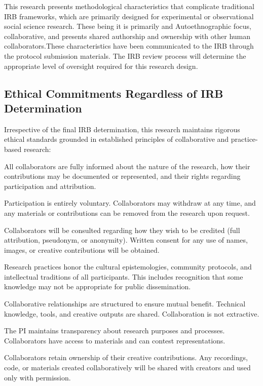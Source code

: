 This research presents methodological characteristics that complicate traditional IRB frameworks, which are primarily designed for experimental or observational social science research. These being it is primarily and Autoethnographic focus, collaborative, and presents shared authorship and ownership with other human collaborators.These characteristics have been communicated to the IRB through the protocol submission materials. The IRB review process will determine the appropriate level of oversight required for this research design.

\subsection*{Ethical Commitments Regardless of IRB Determination}

Irrespective of the final IRB determination, this research maintains rigorous ethical standards grounded in established principles of collaborative and practice-based research:

\begin{description}[noitemsep] 
	\item[Informed Collaboration] All collaborators are fully informed about the nature of the research, how their contributions may be documented or represented, and their rights regarding participation and attribution.
	
	\item[Voluntary and Revocable Participation] Participation is entirely voluntary. Collaborators may withdraw at any time, and any materials or contributions can be removed from the research upon request.
	
	\item[Attribution and Consent] Collaborators will be consulted regarding how they wish to be credited (full attribution, pseudonym, or anonymity). Written consent for any use of names, images, or creative contributions will be obtained.
	
	\item[Cultural Protocols and Respect] Research practices honor the cultural epistemologies, community protocols, and intellectual traditions of all participants. This includes recognition that some knowledge may not be appropriate for public dissemination.
	
	\item[Reciprocity and Mutual Benefit] Collaborative relationships are structured to ensure mutual benefit. Technical knowledge, tools, and creative outputs are shared. Collaboration is not extractive.
	
	\item[Transparency and Accountability] The PI maintains transparency about research purposes and processes. Collaborators have access to materials and can contest representations.
	
	\item[Data Sovereignty] Collaborators retain ownership of their creative contributions. Any recordings, code, or materials created collaboratively will be shared with creators and used only with permission.
\end{description}


